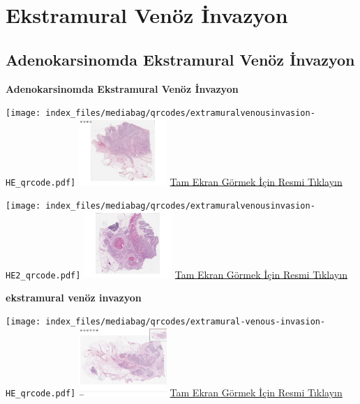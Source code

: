 \documentclass[
  letterpaper,
  DIV=11,
  numbers=noendperiod]{scrreprt}
\begin{document}
\hypertarget{sec-ekstramural-venoz-invazyon}{%
\chapter{Ekstramural Venöz
İnvazyon}\label{sec-ekstramural-venoz-invazyon}}

\hypertarget{sec-adenokarsinomda-ekstramural-venoz-invazyon}{%
\section{Adenokarsinomda Ekstramural Venöz
İnvazyon}\label{sec-adenokarsinomda-ekstramural-venoz-invazyon}}

\textbf{Adenokarsinomda Ekstramural Venöz İnvazyon}

\texttt{[image: index\_files/mediabag/qrcodes/extramuralvenousinvasion-HE\_qrcode.pdf]}
\href{https://images.patolojiatlasi.com/extramuralvenousinvasion/HE.html}{\includegraphics[width=0.25\textwidth,height=\textheight]{./screenshots/thumbnail_extramuralvenousinvasion.png}}
\href{https://images.patolojiatlasi.com/extramuralvenousinvasion/HE.html}{Tam
Ekran Görmek İçin Resmi Tıklayın}

\texttt{[image: index\_files/mediabag/qrcodes/extramuralvenousinvasion-HE2\_qrcode.pdf]}
\href{https://images.patolojiatlasi.com/extramuralvenousinvasion/HE2.html}{\includegraphics[width=0.25\textwidth,height=\textheight]{./screenshots/thumbnail_extramuralvenousinvasion-2.png}}
\href{https://images.patolojiatlasi.com/extramuralvenousinvasion/HE2.html}{Tam
Ekran Görmek İçin Resmi Tıklayın}

\textbf{ekstramural venöz invazyon}

\texttt{[image: index\_files/mediabag/qrcodes/extramural-venous-invasion-HE\_qrcode.pdf]}
\href{https://images.patolojiatlasi.com/extramural-venous-invasion/HE.html}{\includegraphics[width=0.25\textwidth,height=\textheight]{./screenshots/thumbnail_extramural-venous-invasion.png}}
\href{https://images.patolojiatlasi.com/extramural-venous-invasion/HE.html}{Tam
Ekran Görmek İçin Resmi Tıklayın}
\end{document}
